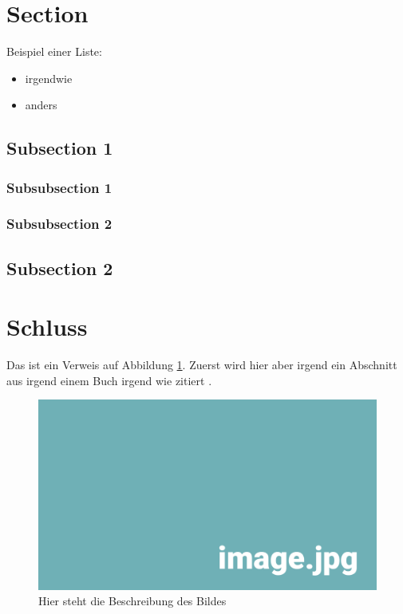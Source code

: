 
\section{Section}

Beispiel einer Liste:

\begin{itemize} 
	\item irgendwie 
	\item anders
\end{itemize}


\subsection{Subsection 1}

\subsubsection{Subsubsection 1}

\subsubsection{Subsubsection 2}


\subsection{Subsection 2}
 

\section{Schluss}

Das ist ein Verweis auf Abbildung \ref{pic:DasBild}. Zuerst wird hier aber irgend ein Abschnitt aus irgend einem Buch irgend wie zitiert \parencite[S. 42--66]{plato_staat_2017}. \\

\begin{figure}[htbp]
	\centering

	\includegraphics[width=\textwidth]{img/image.jpg}

	\caption{Hier steht die Beschreibung des Bildes}
	\label{pic:DasBild}
\end{figure}
